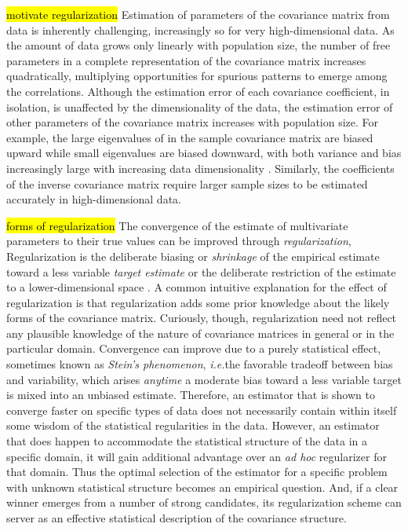 \hl{\tiny motivate regularization} Estimation of parameters of the covariance matrix from data is inherently challenging, increasingly so for very high-dimensional data. As the amount of data grows only linearly with population size, the number of free parameters in a complete representation of the covariance matrix increases quadratically, multiplying opportunities for spurious patterns to emerge among the correlations.  Although the estimation error of each covariance coefficient, in isolation, is unaffected by the dimensionality of the data, the estimation error of other parameters of the covariance matrix increases with population size.  
For example, the large eigenvalues of in the sample covariance matrix are biased upward while small eigenvalues are biased downward, with both variance and bias increasingly large with increasing data dimensionality \citep{Hayes:1981}.  Similarly, the coefficients of the inverse covariance matrix require larger sample sizes to be estimated accurately in high-dimensional data.

\hl{\tiny forms of regularization} The convergence of the estimate of multivariate parameters to their true values can be improved through \emph{regularization},  Regularization is the deliberate biasing or \emph{shrinkage} of the empirical estimate toward a less variable \emph{target estimate} \citep{Schafer:2005} or the deliberate restriction of the estimate to a lower-dimensional space \citep{Dempster:1972,Fan:2008,Friedman:2008,Rothman:2008}.  A common intuitive explanation for the effect of regularization is that regularization adds some prior knowledge about the likely forms of the covariance matrix. Curiously, though, regularization need not reflect any plausible knowledge of the nature of covariance matrices in general or in the particular domain. Convergence can improve due to a purely statistical effect, sometimes known as \emph{Stein's phenomenon}, \emph{i.e.}\;the favorable tradeoff between bias and variability, which arises \emph{anytime} a moderate bias toward a less variable target is mixed into an unbiased estimate.  Therefore, an estimator that is shown to converge faster on specific types of data does not necessarily contain within itself some wisdom of the statistical regularities in the data.  However, an estimator that does happen to accommodate the statistical structure of the data in a specific domain, it will gain additional advantage over an \emph{ad hoc} regularizer for that domain. Thus the optimal selection of the estimator for a specific problem with unknown statistical structure becomes an empirical question. And, if a clear winner emerges from a number of strong candidates, its regularization scheme can server as an effective statistical description of the covariance structure. 

